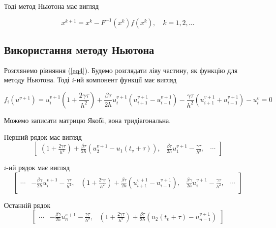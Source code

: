 \documentclass[a4paper,12pt]{article}
\begin{document}
Тоді метод Ньютона має вигляд

\begin{equation} \label{newton_eq}
	x^{k+1} = x^{k} - F^{-1}(x^k) f(x^k), \quad k = 1,2,\ldots
\end{equation}

\subsection{Використання методу Ньютона}

Розглянемо рівняння (\ref{eq4}). Будемо розглядати ліву частину, як функцію для методу Ньютона. Тоді $i$-ий компонент функції має вигляд

\begin{equation} \label{eq5}
	f_i(u^{v+1}) = u_i^{v+1} \left( 1 + \frac{2 \gamma \tau}{h^2} \right) + \frac{\beta \tau}{2h} u^{v+1}_{i} \left( u^{v+1}_{i+1} - u^{v+1}_{i-1} \right) - \frac{\gamma \tau}{h^2} \left( u^{v+1}_{i+1} + u^{v+1}_{i-1} \right) - u^{v}_{i} =0
\end{equation}

Можемо записати матрицю Якобі, вона тридіагональна.

Перший рядок має вигляд
\begin{displaymath}
	\begin{bmatrix}
		\left(1 + \frac{2 \gamma \tau}{h^2} \right)+  \frac{\beta \tau}{2h} \left( u^{v+1}_{2} - u_{1}(t_v+\tau)\right), & \frac{\beta \tau}{2h} u_1^{v+1} - \frac{\gamma \tau}{h^2}, & \cdots
	\end{bmatrix}
\end{displaymath}

$i$-ий рядок має вигляд
\begin{displaymath}
	\begin{bmatrix}
 	 \cdots & -\frac{\beta \gamma}{2h} u^{v+1}_{i} - \frac{\gamma \tau}{h^2}, & \left( 1 + \frac{2 \gamma \tau}{h^2} \right) +  \frac{\beta \tau}{2h} \left( u^{v+1}_{i+1} - u_{i-1}^{v+1}\right), & \frac{\beta \gamma}{2h} u_{i}^{v+1} - \frac{\gamma \tau}{h^2}, & \cdots	
	\end{bmatrix}	
\end{displaymath}

Останній рядок
\begin{displaymath}
\begin{bmatrix}
\cdots & - \frac{\beta \gamma}{2h} u_{n}^{v+1} - \frac{\gamma \tau}{h^2}, & \left( 1 + \frac{2\gamma \tau}{h^2} \right) + \frac{\beta \tau}{2h} \left( u_2(t_v+\tau) - u_{n-1}^{v+1} \right)
\end{bmatrix}	
\end{displaymath}
\end{document}
